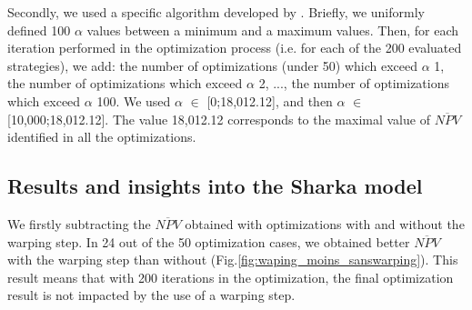 	Secondly, we used a specific algorithm developed by . Briefly, we uniformly defined 100 $\alpha$ values between a minimum and a maximum values. 
	Then, for each iteration performed in the optimization process (i.e. for each of the 200 evaluated strategies), we add: 
	the number of optimizations (under 50) which exceed $\alpha$ 1, the number of optimizations which exceed $\alpha$ 2, ..., 
	the number of optimizations which exceed $\alpha$ 100. We used $\alpha$ $\in$ [0;18,012.12], and then $\alpha$ $\in$ [10,000;18,012.12]. 
	The value 18,012.12 corresponds to the maximal value of $\overline{NPV}$ identified in all the optimizations.
	
	\subsection{Results and insights into the Sharka model}
	
	We firstly subtracting the $\overline{NPV}$ obtained with optimizations with and without the warping step. 
	In 24 out of the 50 optimization cases, we obtained better $\overline{NPV}$ with the warping step than without (Fig.\ref{fig:waping_moins_sanswarping}). 
	This result means that with 200 iterations in the optimization, the final optimization result is not impacted by the use of a warping step.
	
